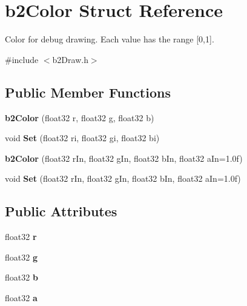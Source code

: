 \hypertarget{structb2Color}{}\section{b2\+Color Struct Reference}
\label{structb2Color}


Color for debug drawing. Each value has the range \mbox{[}0,1\mbox{]}.  




{\ttfamily \#include $<$b2\+Draw.\+h$>$}

\subsection*{Public Member Functions}
\begin{DoxyCompactItemize}
\item 
\mbox{\label{structb2Color_abddfc60d402d691542a224921868bfb7}} 
{\bfseries b2\+Color} (float32 r, float32 g, float32 b)
\item 
\mbox{\label{structb2Color_af35a718911e10a54fa8aaa86367a5b56}} 
void {\bfseries Set} (float32 ri, float32 gi, float32 bi)
\item 
\mbox{\label{structb2Color_a7cceec6dae0dccd757f35eacd41595c6}} 
{\bfseries b2\+Color} (float32 r\+In, float32 g\+In, float32 b\+In, float32 a\+In=1.\+0f)
\item 
\mbox{\label{structb2Color_aecd71c7fe34182071a5e4699c4fd5cae}} 
void {\bfseries Set} (float32 r\+In, float32 g\+In, float32 b\+In, float32 a\+In=1.\+0f)
\end{DoxyCompactItemize}
\subsection*{Public Attributes}
\begin{DoxyCompactItemize}
\item 
\mbox{\label{structb2Color_a9ab6c9a910caee177d96980b74ffb00b}} 
float32 {\bfseries r}
\item 
\mbox{\label{structb2Color_a241c742352403ec456b51ac5f2abe7d9}} 
float32 {\bfseries g}
\item 
\mbox{\label{structb2Color_a9e7380d27a63010cfad49b97f66dcd26}} 
float32 {\bfseries b}
\item 
\mbox{\label{structb2Color_adf752d6bc4b05221be1d964e47cf716d}} 
float32 {\bfseries a}
\end{DoxyCompactItemize}


